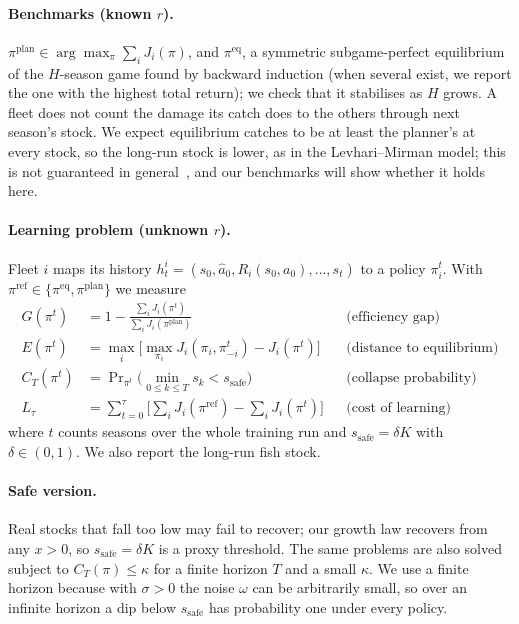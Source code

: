 \documentclass{article}
\begin{document}
\paragraph{Benchmarks (known $r$).} $\pi^{\mathrm{plan}}\in\arg\max_{\pi}\sum_i J_i(\pi)$, and $\pi^{\mathrm{eq}}$, a symmetric subgame-perfect equilibrium of the $H$-season game found by backward induction (when several exist, we report the one with the highest total return); we check that it stabilises as $H$ grows. A fleet does not count the damage its catch does to the others through next season's stock. We expect equilibrium catches to be at least the planner's at every stock, so the long-run stock is lower, as in the Levhari--Mirman model; this is not guaranteed in general~\cite{dutta1993}, and our benchmarks will show whether it holds here.

\paragraph{Learning problem (unknown $r$).} Fleet $i$ maps its history $h^i_t=(s_0,\hat a_0,R_i(s_0,a_0),\dots,s_t)$ to a policy $\pi^t_i$. With
$\pi^{\mathrm{ref}}\in\{\pi^{\mathrm{eq}},\pi^{\mathrm{plan}}\}$ we measure
\begin{align}
G(\pi^t)&=1-\frac{\sum_i J_i(\pi^t)}{\sum_i J_i(\pi^{\mathrm{plan}})} &&\text{(efficiency gap)}\\
E(\pi^t)&=\max_{i}\Big[\max_{\pi_i}J_i(\pi_i,\pi^t_{-i})-J_i(\pi^t)\Big] &&\text{(distance to equilibrium)}\\
C_T(\pi^t)&=\Pr\nolimits_{\pi^t}\Big(\min_{0\le k\le T}s_k<s_{\mathrm{safe}}\Big) &&\text{(collapse probability)}\\
L_\tau&=\sum_{t=0}^{\tau}\Big[\sum_i J_i(\pi^{\mathrm{ref}})-\sum_i J_i(\pi^t)\Big] &&\text{(cost of learning)}
\end{align}
where $t$ counts seasons over the whole training run and $s_{\mathrm{safe}}=\delta K$ with $\delta\in(0,1)$. We also report the long-run fish stock.

\paragraph{Safe version.} Real stocks that fall too low may fail to recover; our growth law recovers from any $x>0$, so $s_{\mathrm{safe}}=\delta K$ is a proxy threshold. The same problems are also solved subject to $C_T(\pi)\le\kappa$ for a finite horizon $T$ and a small $\kappa$. We use a finite horizon because with $\sigma>0$ the noise $\omega$ can be arbitrarily small, so over an infinite horizon a dip below $s_{\mathrm{safe}}$ has probability one under every policy.
\end{document}
